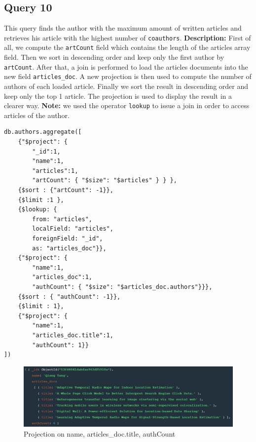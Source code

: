 \documentclass{Configuration_Files/PoliMi3i_thesis}
\begin{document}
\subsection{Query 10}
This query finds the author with the maximum amount of written articles and retrieves his article with the highest number
of \verb |coauthors|.\newline
\textbf{Description:} First of all, we compute the \verb |artCount| field which contains the length of the articles array field.
Then we sort in descending order and keep only the first author by \verb |artCount|. After that, a join is performed to load the
articles documents into the new field \verb |articles_doc|. A new projection is then used to compute the number of authors of
each loaded article. Finally we sort the result in descending order and keep only the top 1 article. The projection is used
to display the result in a clearer way.\newline
\textbf{Note:} we used the operator \verb |lookup| to issue a join in order to access articles of the author.
\begin{lstlisting}
db.authors.aggregate([
	{"$project": {
		"_id":1,
		"name":1,
		"articles":1,
		"artCount": { "$size": "$articles" } } },
	{$sort : {"artCount": -1}},
	{$limit :1 },
	{$lookup: {
		from: "articles",
		localField: "articles",
		foreignField: "_id",
		as: "articles_doc"}},
	{"$project": {
		"name":1,
		"articles_doc":1,
		"authCount": { "$size": "$articles_doc.authors"}}},
	{$sort : { "authCount": -1}},
	{$limit : 1},
	{"$project": {
		"name":1,
		"articles_doc.title":1,
		"authCount": 1}}
])
\end{lstlisting}
\begin{figure}[H]
\centering
\includegraphics[width=1\textwidth]{query/mongo_q10.PNG}
\caption{Projection on name, articles\_doc.title, authCount}
\label{fig:query10}
\end{figure}
\end{document}
